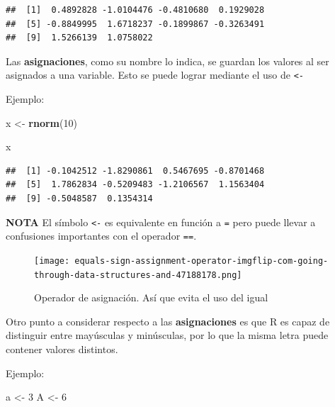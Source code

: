 \documentclass[
]{book}
\newenvironment{Shaded}{\begin{snugshade}}{\end{snugshade}}
\newcommand{\DecValTok}[1]{\textcolor[rgb]{0.00,0.00,0.81}{#1}}
\newcommand{\FunctionTok}[1]{\textcolor[rgb]{0.13,0.29,0.53}{\textbf{#1}}}
\newcommand{\NormalTok}[1]{#1}
\newcommand{\OtherTok}[1]{\textcolor[rgb]{0.56,0.35,0.01}{#1}}
\begin{document}
\begin{verbatim}
##  [1]  0.4892828 -1.0104476 -0.4810680  0.1929028
##  [5] -0.8849995  1.6718237 -0.1899867 -0.3263491
##  [9]  1.5266139  1.0758022
\end{verbatim}

Las \textbf{asignaciones}, como su nombre lo indica, se guardan los valores al ser asignados a una variable. Esto se puede lograr mediante el uso de \texttt{\textless{}-}

Ejemplo:

\begin{Shaded}
\begin{Highlighting}[]
\NormalTok{x }\OtherTok{\textless{}{-}} \FunctionTok{rnorm}\NormalTok{(}\DecValTok{10}\NormalTok{)}
\end{Highlighting}
\end{Shaded}

\begin{Shaded}
\begin{Highlighting}[]
\NormalTok{x}
\end{Highlighting}
\end{Shaded}

\begin{verbatim}
##  [1] -0.1042512 -1.8290861  0.5467695 -0.8701468
##  [5]  1.7862834 -0.5209483 -1.2106567  1.1563404
##  [9] -0.5048587  0.1354314
\end{verbatim}

\textbf{NOTA} El símbolo \texttt{\textless{}-} es equivalente en función a \texttt{=} pero puede llevar a confusiones importantes con el operador \texttt{==}.

\begin{figure}
\centering
\texttt{[image: equals-sign-assignment-operator-imgflip-com-going-through-data-structures-and-47188178.png]}
\caption{Operador de asignación. Así que evita el uso del igual}
\end{figure}

Otro punto a considerar respecto a las \textbf{asignaciones} es que R es capaz de distinguir entre mayúsculas y minúsculas, por lo que la misma letra puede contener valores distintos.

Ejemplo:

\begin{Shaded}
\begin{Highlighting}[]
\NormalTok{a }\OtherTok{\textless{}{-}} \DecValTok{3}
\NormalTok{A }\OtherTok{\textless{}{-}} \DecValTok{6}
\end{Highlighting}
\end{Shaded}
\end{document}
